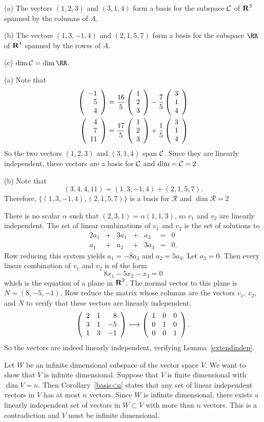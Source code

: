 \documentclass{ximera}
\begin{document}
\ans (a) The vectors $(1,2,3)$ and $(3,1,4)$ form a basis for the subspace
	${\cal C}$ of $\mbox{$\bf{R}$}^3$ spanned by the columns of $A$.

(b) The vectors $(1,3,-1,4)$ and $(2,1,5,7)$ form a basis for the subspace
	$\RR$ of $\mbox{$\bf{R}$}^4$ spanned by the rowss of $A$.

(c) $\dim \CC = \dim \RR$.

\soln (a) Note that 
\begin{eqnarray*} 
\left(\begin{array}{r} -1 \\ 5 \\ 4\end{array}\right) = \frac{16}{5}\left(\begin{array}{r} 1 \\ 2 \\ 3\end{array}\right) 
	- \frac{7}{5}\left(\begin{array}{r} 3 \\ 1 \\ 4\end{array}\right) \\ 
\left(\begin{array}{r} 4 \\ 7 \\ 11\end{array}\right) = \frac{17}{5}\left(\begin{array}{r} 1 \\ 2 \\ 3\end{array}\right) 
	+ \frac{1}{5}\left(\begin{array}{r} 3 \\ 1 \\ 4\end{array}\right)
\end{eqnarray*}
So the two vectors $(1, 2, 3)$ and $(3,1,4)$ span ${\cal C}$.  Since they are 
linearly independent, these vectors are a basis for ${\cal C}$ and $\dim ={\cal C}=2$.

(b) Note that 
\[
(3,4,4,11) = (1,3,-1,4) + (2,1,5,7).
\]
Therefore, $\{(1,3,-1,4),(2,1,5,7)\}$ is a basis for $\mathcal{R}$ and 
$\dim \mathcal{R}=2$


There is no scalar $\alpha$ such that $(2,3,1) = \alpha(1,1,3)$, so
$v_1$ and $v_2$ are linearly independent.
The set of linear combinations of $v_1$ and $v_2$ is the set of
solutions to
\[
\begin{array}{rrrrrrl}
2a_1 & + & 3a_1 & + & a_3 & = & 0 \\
a_1 & + & a_2 & + & 3a_3 & = & 0. \end{array}
\]
Row reducing this system yields $a_1 = -8a_3$ and $a_2 = 5a_3$.
Let $a_3 = 0$.  Then every linear combination of $v_1$ and $v_2$ is
of the form
\[
8x_1 - 5x_2 - x_3 = 0
\]
which is the equation of a plane in $\mbox{$\bf{R}$}^3$.  The normal vector to this
plane is $N = (8,-5,-1)$.  Row reduce the matrix whose columns
are the vectors $v_1$, $v_2$, and $N$ to verify that these vectors
are linearly independent.
\[
\left(\begin{array}{rrr} 2 & 1 & 8 \\ 3 & 1 & -5 \\ 1 & 3 & -1\end{array}\right) \longrightarrow
\left(\begin{array}{rrr} 1 & 0 & 0 \\ 0 & 1 & 0 \\ 0 & 0 & 1\end{array}\right).
\]
So the vectors are indeed linearly independent, verifying
Lemma~\ref{extendindep}.

  Let $W$ be an infinite dimensional subspace of the vector 
space $V$.  We want to show that $V$ is infinite dimensional.  Suppose that
$V$ is finite dimensional with $\dim V=n$.  Then Corollary~\ref{basis<n}
states that any set of linear independent 
vectors in $V$ has at most $n$ vectors.  Since $W$ is infinite dimensional, 
there exists a linearly independent set of vectors in $W\subset V$ with more 
than $n$ vectors.  This is a contradiction and $V$ must be infinite 
dimensional.
\end{document}
